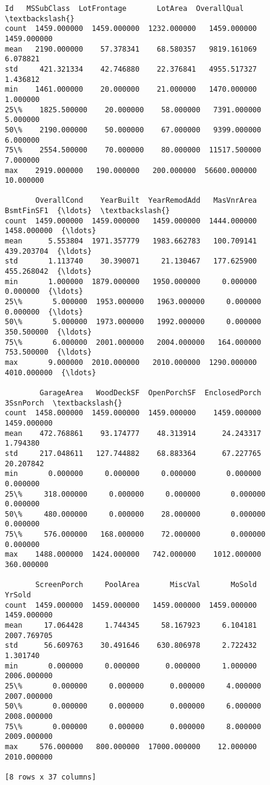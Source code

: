 \documentclass[11pt]{article}
\makeatletter
\newcommand{\boxspacing}{\kern\kvtcb@left@rule\kern\kvtcb@boxsep}
\newcommand{\prompt}[4]{
        \ttfamily\llap{{\color{#2}[#3]:\hspace{3pt}#4}}\vspace{-\baselineskip}
    }
\makeatother
\begin{document}
            \begin{tcolorbox}[breakable, size=fbox, boxrule=.5pt, pad at break*=1mm, opacityfill=0]
\prompt{Out}{outcolor}{7}{\boxspacing}
\begin{Verbatim}[commandchars=\\\{\}]
                Id   MSSubClass  LotFrontage       LotArea  OverallQual  \textbackslash{}
count  1459.000000  1459.000000  1232.000000   1459.000000  1459.000000
mean   2190.000000    57.378341    68.580357   9819.161069     6.078821
std     421.321334    42.746880    22.376841   4955.517327     1.436812
min    1461.000000    20.000000    21.000000   1470.000000     1.000000
25\%    1825.500000    20.000000    58.000000   7391.000000     5.000000
50\%    2190.000000    50.000000    67.000000   9399.000000     6.000000
75\%    2554.500000    70.000000    80.000000  11517.500000     7.000000
max    2919.000000   190.000000   200.000000  56600.000000    10.000000

       OverallCond    YearBuilt  YearRemodAdd   MasVnrArea   BsmtFinSF1  {\ldots}  \textbackslash{}
count  1459.000000  1459.000000   1459.000000  1444.000000  1458.000000  {\ldots}
mean      5.553804  1971.357779   1983.662783   100.709141   439.203704  {\ldots}
std       1.113740    30.390071     21.130467   177.625900   455.268042  {\ldots}
min       1.000000  1879.000000   1950.000000     0.000000     0.000000  {\ldots}
25\%       5.000000  1953.000000   1963.000000     0.000000     0.000000  {\ldots}
50\%       5.000000  1973.000000   1992.000000     0.000000   350.500000  {\ldots}
75\%       6.000000  2001.000000   2004.000000   164.000000   753.500000  {\ldots}
max       9.000000  2010.000000   2010.000000  1290.000000  4010.000000  {\ldots}

        GarageArea   WoodDeckSF  OpenPorchSF  EnclosedPorch    3SsnPorch  \textbackslash{}
count  1458.000000  1459.000000  1459.000000    1459.000000  1459.000000
mean    472.768861    93.174777    48.313914      24.243317     1.794380
std     217.048611   127.744882    68.883364      67.227765    20.207842
min       0.000000     0.000000     0.000000       0.000000     0.000000
25\%     318.000000     0.000000     0.000000       0.000000     0.000000
50\%     480.000000     0.000000    28.000000       0.000000     0.000000
75\%     576.000000   168.000000    72.000000       0.000000     0.000000
max    1488.000000  1424.000000   742.000000    1012.000000   360.000000

       ScreenPorch     PoolArea       MiscVal       MoSold       YrSold
count  1459.000000  1459.000000   1459.000000  1459.000000  1459.000000
mean     17.064428     1.744345     58.167923     6.104181  2007.769705
std      56.609763    30.491646    630.806978     2.722432     1.301740
min       0.000000     0.000000      0.000000     1.000000  2006.000000
25\%       0.000000     0.000000      0.000000     4.000000  2007.000000
50\%       0.000000     0.000000      0.000000     6.000000  2008.000000
75\%       0.000000     0.000000      0.000000     8.000000  2009.000000
max     576.000000   800.000000  17000.000000    12.000000  2010.000000

[8 rows x 37 columns]
\end{Verbatim}
\end{tcolorbox}
        
\end{document}
